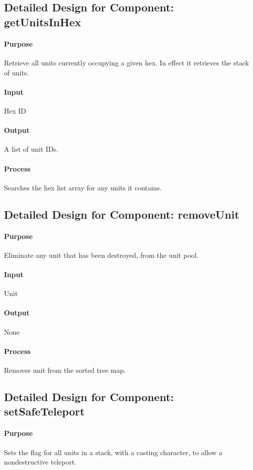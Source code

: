 \documentclass[12pt,a4paper,titlepage]{article}
\begin{document}
\subsection{Detailed Design for Component: getUnitsInHex}
\paragraph{Purpose} Retrieve all units currently occupying a given hex.  In effect it retrieves the stack of units.
\paragraph{Input} Hex ID
\paragraph{Output} A list of unit IDs.
\paragraph{Process} Searches the hex list array for any units it contains.

\subsection{Detailed Design for Component: removeUnit}
\paragraph{Purpose} Eliminate any unit that has been destroyed, from the unit pool.
\paragraph{Input} Unit
\paragraph{Output} None
\paragraph{Process} Removes unit from the sorted tree map.

\subsection{Detailed Design for Component: setSafeTeleport}
\paragraph{Purpose} Sets the flag for all units in a stack, with a casting character, to allow a nondestructive teleport.
\end{document}
